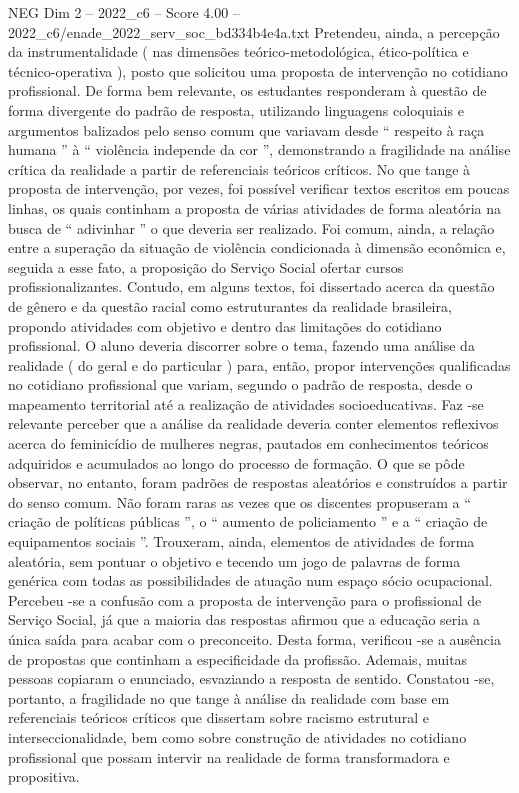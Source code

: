 \begin{textsample}{NEG Dim 2 – 2022\_c6 – Score 4.00 – 2022\_c6/enade\_2022\_serv\_soc\_bd334b4e4a.txt}
Pretendeu, ainda, a percepção da instrumentalidade ( nas dimensões teórico-metodológica, ético-política e técnico-operativa ), posto que solicitou uma proposta de intervenção no cotidiano profissional.
De forma bem relevante, os estudantes responderam à questão de forma divergente do padrão de resposta, utilizando linguagens coloquiais e argumentos balizados pelo senso comum que variavam desde “ respeito à raça humana ” à “ violência independe da cor ”, demonstrando a fragilidade na análise crítica da realidade a partir de referenciais teóricos críticos.
No que tange à proposta de intervenção, por vezes, foi possível verificar textos escritos em poucas linhas, os quais continham a proposta de várias atividades de forma aleatória na busca de “ adivinhar ” o que deveria ser realizado.
Foi comum, ainda, a relação entre a superação da situação de violência condicionada à dimensão econômica e, seguida a esse fato, a proposição do Serviço Social ofertar cursos profissionalizantes.
Contudo, em alguns textos, foi dissertado acerca da questão de gênero e da questão racial como estruturantes da realidade brasileira, propondo atividades com objetivo e dentro das limitações do cotidiano profissional.
O aluno deveria discorrer sobre o tema, fazendo uma análise da realidade ( do geral e do particular ) para, então, propor intervenções qualificadas no cotidiano profissional que variam, segundo o padrão de resposta, desde o mapeamento territorial até a realização de atividades socioeducativas.
Faz -se relevante perceber que a análise da realidade deveria conter elementos reflexivos acerca do feminicídio de mulheres negras, pautados em conhecimentos teóricos adquiridos e acumulados ao longo do processo de formação.
O que se pôde observar, no entanto, foram padrões de respostas aleatórios e construídos a partir do senso comum.
Não foram raras as vezes que os discentes propuseram a “ criação de políticas públicas ”, o “ aumento de policiamento ” e a “ criação de equipamentos sociais ”.
Trouxeram, ainda, elementos de atividades de forma aleatória, sem pontuar o objetivo e tecendo um jogo de palavras de forma genérica com todas as possibilidades de atuação num espaço sócio ocupacional.
Percebeu -se a confusão com a proposta de intervenção para o profissional de Serviço Social, já que a maioria das respostas afirmou que a educação seria a única saída para acabar com o preconceito.
Desta forma, verificou -se a ausência de propostas que continham a especificidade da profissão.
Ademais, muitas pessoas copiaram o enunciado, esvaziando a resposta de sentido.
Constatou -se, portanto, a fragilidade no que tange à análise da realidade com base em referenciais teóricos críticos que dissertam sobre racismo estrutural e interseccionalidade, bem como sobre construção de atividades no cotidiano profissional que possam intervir na realidade de forma transformadora e propositiva.

\end{textsample}
